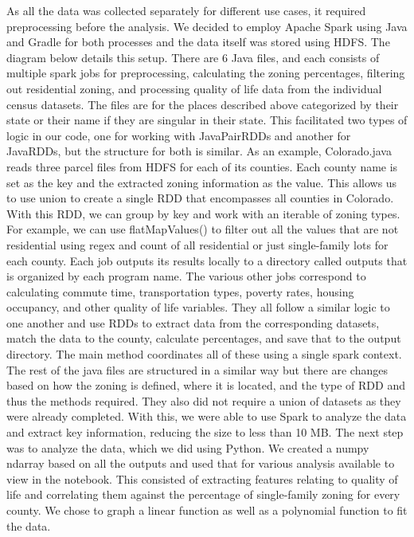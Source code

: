 \documentclass[titlepage]{article}
\begin{document}
As all the data was collected separately for different use cases, it required preprocessing before the analysis. We decided to employ Apache Spark using Java and Gradle for both processes and the data itself was stored using HDFS. The diagram below details this setup. There are 6 Java files, and each consists of multiple spark jobs for preprocessing, calculating the zoning percentages, filtering out residential zoning, and processing quality of life data from the individual census datasets. The files are for the places described above categorized by their state or their name if they are singular in their state. This facilitated two types of logic in our code, one for working with JavaPairRDDs and another for JavaRDDs, but the structure for both is similar. As an example, Colorado.java reads three parcel files from HDFS for each of its counties. Each county name is set as the key and the extracted zoning information as the value. This allows us to use union to create a single RDD that encompasses all counties in Colorado. With this RDD, we can group by key and work with an iterable of zoning types. For example, we can use flatMapValues() to filter out all the values that are not residential using regex and count of all residential or just single-family lots for each county. Each job outputs its results locally to a directory called outputs that is organized by each program name. The various other jobs correspond to calculating commute time, transportation types, poverty rates, housing occupancy, and other quality of life variables. They all follow a similar logic to one another and use RDDs to extract data from the corresponding datasets, match the data to the county, calculate percentages, and save that to the output directory. The main method coordinates all of these using a single spark context. The rest of the java files are structured in a similar way but there are changes based on how the zoning is defined, where it is located, and the type of RDD and thus the methods required. They also did not require a union of datasets as they were already completed. With this, we were able to use Spark to analyze the data and extract key information, reducing the size to less than 10 MB. The next step was to analyze the data, which we did using Python. We created a numpy ndarray based on all the outputs and used that for various analysis available to view in the notebook. This consisted of extracting features relating to quality of life and correlating them against the percentage of single-family zoning for every county. We chose to graph a linear function as well as a polynomial function to fit the data.
\end{document}
